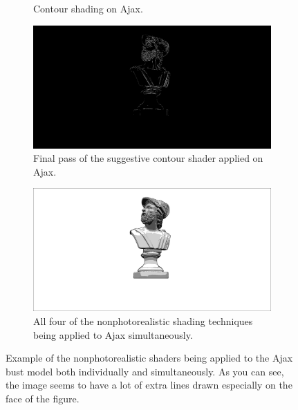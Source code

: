 \documentclass[10pt,twocolumn,letterpaper]{article}
\begin{document}
\begin{figure}
\begin{subfigure}{.48\linewidth}
        \caption{Contour shading on Ajax.}
        \label{fig:ajax-contours}
    \end{subfigure}
    \hfill
    \begin{subfigure}{.48\linewidth}
        \includegraphics[width=1\linewidth]{ajax/sugg_contours.png}
        \caption{Final pass of the suggestive contour shader applied on Ajax.}
        \label{fig:ajax-suggs}
    \end{subfigure}
    \hfill
    \begin{subfigure}{1\linewidth}
        \includegraphics[width=1\linewidth]{ajax/final.png}
        \caption{All four of the nonphotorealistic shading techniques being applied to Ajax simultaneously.}
        \label{fig:ajax-anime}
    \end{subfigure}
    \caption{Example of the nonphotorealistic shaders being applied to the Ajax bust model both individually and simultaneously. As you can see, the image seems to have a lot of extra lines drawn especially on the face of the figure.}
    \label{fig:ajax}
\end{figure}



\end{document}
